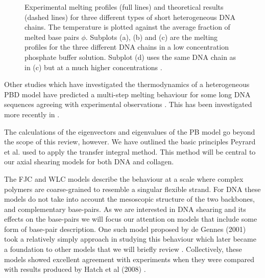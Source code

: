 \begin{figure}[H]
\caption{Experimental melting profiles (full lines) and theoretical results (dashed lines) for three different types of short heterogeneous DNA chains. The temperature is plotted against the average fraction of melted base pairs $\phi$. Subplots (a), (b) and (c) are the melting profiles for the three different DNA chains in a low concentration phosphate buffer solution. Subplot (d) uses the same DNA chain as in (c) but at a much higher concentrations \cite{Campa1998}.}
\label{fig:pbd_exp_test}
\end{figure}
%
Other studies which have investigated the thermodynamics of a heterogeneous PBD model have predicted a multi-step melting behaviour for some long DNA sequences agreeing with experimental observations \cite{Cule1997}. This has been investigated more recently in \cite{Theodorakopoulos2010}. 

The calculations of the eigenvectors and eigenvalues of the PB model go beyond the scope of this review, however. We have outlined the basic principles Peyrard et al. used to apply the transfer integral method. This method will be central to our axial shearing models for both DNA and collagen.

The FJC and WLC models describe the behaviour at a scale where complex polymers are coarse-grained to resemble a singular flexible strand. For DNA these models do not take into account the mesoscopic structure of the two backbones, and complementary base-pairs. As we are interested in DNA shearing and its effects on the base-pairs we will focus our attention on models that include some form of base-pair description. One such model proposed by de Gennes (2001) took a relatively simply approach in studying this behaviour which later became a foundation to other models that we will briefly review \cite{DeGennes2001,Chakrabarti2009,Prakash2011,Mishra2011a}. Collectively, these models showed excellent agreement with experiments when they were compared with results produced by Hatch et al (2008) \cite{Hatch2008}.

